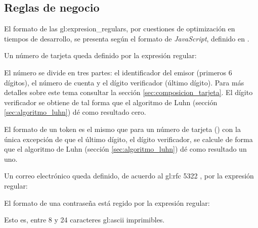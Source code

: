 %
%

\subsection{Reglas de negocio}

El formato de las \glspl{gl:expresion_regular}, por cuestiones de optimización
en tiempos de desarrollo, se presenta según el formato de \textit{JavaScript},
definido en \cite{mozilla_er}.

{
  Un número de tarjeta queda definido por la expresión regular:


  El número se divide en tres partes: el identificador del emisor (primeros 6
  dígitos), el número de cuenta y el dígito verificador (último dígito). Para
  más detalles sobre este tema consultar la sección
  \ref{sec:composicion_tarjeta}. El dígito verificador se obtiene de tal forma
  que el algoritmo de Luhn (sección \ref{sec:algoritmo_luhn}) dé como resultado
  cero.
}

{
  El formato de un token es el mismo que para un número de tarjeta
  () con la única excepción de que el
  último dígito, el dígito verificador, se calcule de forma que el algoritmo de
  Luhn (sección \ref{sec:algoritmo_luhn}) dé como resultado un uno.
}

{
  Un correo electrónico queda definido, de acuerdo al \gls{gl:rfc} 5322
  \cite{DBLP:journals/rfc/rfc5322}, por la expresión regular:

}

{
  El formato de una contraseña está regido por la expresión regular:


  Esto es, entre 8 y 24 caracteres \gls{gl:ascii} imprimibles.
}

